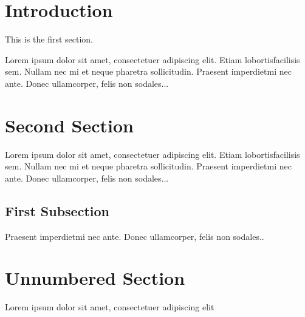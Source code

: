 \documentclass{report}
\begin{document}
\section{Introduction}

This is the first section.

Lorem  ipsum  dolor  sit  amet,  consectetuer  adipiscing  
elit.   Etiam  lobortisfacilisis sem.  Nullam nec mi et 
neque pharetra sollicitudin.  Praesent imperdietmi nec ante. 
Donec ullamcorper, felis non sodales...


\section{Second Section}

Lorem  ipsum  dolor  sit  amet,  consectetuer  adipiscing  
elit.   Etiam  lobortisfacilisis sem.  Nullam nec mi et 
neque pharetra sollicitudin.  Praesent imperdietmi nec ante. 
Donec ullamcorper, felis non sodales...

\subsection{First Subsection}
Praesent imperdietmi nec ante. Donec ullamcorper, felis non sodales..

\section*{Unnumbered Section}
Lorem  ipsum  dolor  sit  amet,  consectetuer  adipiscing  
elit
\end{document}
